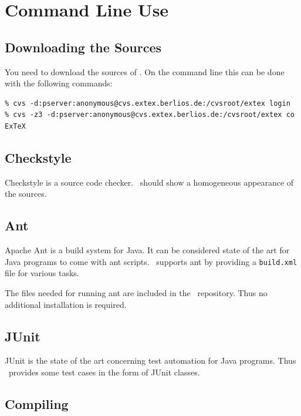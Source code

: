 \documentclass{extex-doc}
\begin{document}
\section{Command Line Use}


\subsection{Downloading the Sources}

You need to download the sources of \ExTeX. On the command line this
can be done with the following commands:

\begin{verbatim}
% cvs -d:pserver:anonymous@cvs.extex.berlios.de:/cvsroot/extex login
% cvs -z3 -d:pserver:anonymous@cvs.extex.berlios.de:/cvsroot/extex co ExTeX
\end{verbatim}


\subsection{Checkstyle}

Checkstyle is a source code checker.
\ExTeX\ should show a homogeneous appearance of the sources.

\INCOMPLETE

\subsection{Ant}

Apache Ant is a build system for Java. It can be considered state of
the art for Java programs to come with ant scripts. \ExTeX\ supports
ant by providing a \texttt{build.xml} file for various tasks.

The files needed for running ant are included in the \ExTeX\
repository. Thus no additional installation is required.


\INCOMPLETE


\subsection{JUnit}

JUnit is the state of the art concerning test automation for Java
programs. Thus \ExTeX\ provides some test cases in the form of JUnit
classes.

\INCOMPLETE


\subsection{Compiling \ExTeX}
\end{document}
